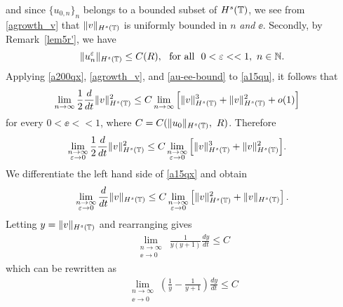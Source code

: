 and since $\{u_{0,n}\}_n$ belongs to a bounded subset of
$H^s(\mathbb{T})$, we see from \eqref{agrowth_v} that $\|v \|_{H^s(\mathbb{T})}$ is
uniformly bounded in $n$ \emph{and} $\ee$.  Secondly, by Remark~\ref{lem5r'}, we have 
\begin{equation}
\label{au-ee-bound}
\|u^\varepsilon_n \|_{H^s(\mathbb{T})} \le C(R), \ \ \text{for all} \ \ 0 < \varepsilon <<1, \ n \in
\mathbb{N}.
\end{equation}
Applying \eqref{a200qx}, \eqref{agrowth_v}, and \eqref{au-ee-bound}
to \eqref{a15qu}, it follows that 
\begin{equation*}
\label{lim-est-in}
\begin{split}
\lim_{n \to \infty }
\frac{1}{2}\frac{d}{dt}\|v\|_{H^{s}(\mathbb{T})}^2
& \le
C \lim_{n \to \infty} \Big [\|v\|_{H^s(\mathbb{T})}^3 +
\|v\|_{H^s(\mathbb{T})}^2 + o(1)\Big ]
\end{split}
\end{equation*}
for every $0 < \ee <<1$, where $C = C(\|u_0\|_{H^s(\mathbb{T})}, \ R)$.
Therefore
\begin{equation}
\begin{split}
\lim_{\substack{n \to \infty \\ \varepsilon \to 0} }
\frac{1}{2}\frac{d}{dt}\|v\|_{H^{s}(\mathbb{T})}^2
& \le C
\lim_{\substack{n \to \infty \\ \varepsilon \to 0}}
\Big [\|v\|_{H^s(\mathbb{T})}^3 + 
\|v\|_{H^s(\mathbb{T})}^2 \Big ].
\label{a15qx}
\end{split}
\end{equation}
We differentiate the left hand side of \eqref{a15qx} and obtain
\begin{equation*}
\begin{split}
\lim_{\substack{n \to \infty \\ \varepsilon \to 0}}\frac{d}{dt}
\|v\|_{H^s(\mathbb{T})} \le C
\lim_{\substack{n \to \infty \\ \varepsilon \to 0}} \left [\|v\|_{H^s(\mathbb{T})}^2 +
\|v\|_{H^s(\mathbb{T})} \right ].
\end{split}
\end{equation*}
Letting $y = \|v\|_{H^s(\mathbb{T})}$ and rearranging gives
\begin{equation*}
\begin{split}
\lim_{\substack{n \to \infty \\ \ee \to 0} } \ \frac{1}{y(y+1)} \frac{dy}{dt}
\le	C
\end{split}
\end{equation*}
which can be rewritten as
\begin{equation*}
\begin{split}
\lim_{\substack{n \to \infty \\ \ee \to 0} }
\left( \frac{1}{y} - \frac{1}{y+1} \right)\frac{dy}{dt} \le C 
\end{split}
\end{equation*}
